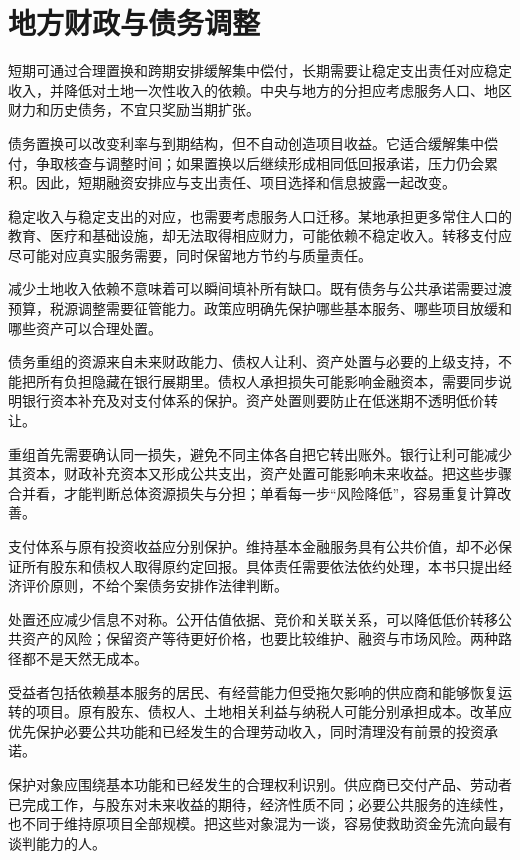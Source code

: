 \documentclass[UTF8,fontset=fandol,zihao=-4,oneside,openany]{ctexbook}
\begin{document}
\section{地方财政与债务调整}
短期可通过合理置换和跨期安排缓解集中偿付，长期需要让稳定支出责任对应稳定收入，并降低对土地一次性收入的依赖。中央与地方的分担应考虑服务人口、地区财力和历史债务，不宜只奖励当期扩张。

\label{arg:P262}
债务置换可以改变利率与到期结构，但不自动创造项目收益。它适合缓解集中偿付，争取核查与调整时间；如果置换以后继续形成相同低回报承诺，压力仍会累积。因此，短期融资安排应与支出责任、项目选择和信息披露一起改变。

稳定收入与稳定支出的对应，也需要考虑服务人口迁移。某地承担更多常住人口的教育、医疗和基础设施，却无法取得相应财力，可能依赖不稳定收入。转移支付应尽可能对应真实服务需要，同时保留地方节约与质量责任。

减少土地收入依赖不意味着可以瞬间填补所有缺口。既有债务与公共承诺需要过渡预算，税源调整需要征管能力。政策应明确先保护哪些基本服务、哪些项目放缓和哪些资产可以合理处置。

债务重组的资源来自未来财政能力、债权人让利、资产处置与必要的上级支持，不能把所有负担隐藏在银行展期里。债权人承担损失可能影响金融资本，需要同步说明银行资本补充及对支付体系的保护。资产处置则要防止在低迷期不透明低价转让。

\label{arg:P263}
重组首先需要确认同一损失，避免不同主体各自把它转出账外。银行让利可能减少其资本，财政补充资本又形成公共支出，资产处置可能影响未来收益。把这些步骤合并看，才能判断总体资源损失与分担；单看每一步“风险降低”，容易重复计算改善。

支付体系与原有投资收益应分别保护。维持基本金融服务具有公共价值，却不必保证所有股东和债权人取得原约定回报。具体责任需要依法依约处理，本书只提出经济评价原则，不给个案债务安排作法律判断。

处置还应减少信息不对称。公开估值依据、竞价和关联关系，可以降低低价转移公共资产的风险；保留资产等待更好价格，也要比较维护、融资与市场风险。两种路径都不是天然无成本。

受益者包括依赖基本服务的居民、有经营能力但受拖欠影响的供应商和能够恢复运转的项目。原有股东、债权人、土地相关利益与纳税人可能分别承担成本。改革应优先保护必要公共功能和已经发生的合理劳动收入，同时清理没有前景的投资承诺。

\label{arg:P264}
保护对象应围绕基本功能和已经发生的合理权利识别。供应商已交付产品、劳动者已完成工作，与股东对未来收益的期待，经济性质不同；必要公共服务的连续性，也不同于维持原项目全部规模。把这些对象混为一谈，容易使救助资金先流向最有谈判能力的人。
\end{document}
